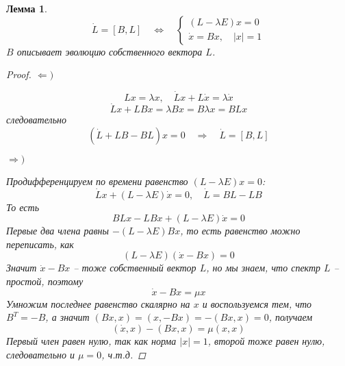 \documentclass[a4paper,12pt]{article}
\newtheorem{lemma}{Лемма}
\theoremstyle{definition}
\theoremstyle{definition}
\theoremstyle{definition}
\begin{document}
\begin{lemma}
  \begin{equation}
    \label{eq:5}
      \dot{L}=[B,L] \quad\Longleftrightarrow\quad \left\{
          \begin{array}{l}
            (L-\lambda E)x=0\\
            \dot{x}=B x,\quad |x|=1
          \end{array}
          \right.
  \end{equation}
$B$ описывает эволюцию собственного вектора $L$.
\begin{proof}
  $\Leftarrow )$

  \begin{equation*}
    Lx=\lambda x, \quad \dot{L}x+L\dot{x}=\lambda\dot{x}
  \end{equation*}
  \begin{equation*}
    \dot{L}x+L B  x=\lambda B x = B\lambda x= BL x
  \end{equation*}
  следовательно
  \begin{equation*}
    (\dot{L}+LB-BL)x=0\quad\Rightarrow \quad \dot{L}=[B,L]
  \end{equation*}

  $\Rightarrow )$

  Продифференцируем по времени равенство $(L-\lambda E)x=0$:
  \begin{equation*}
    \dot{L}x+(L-\lambda E)\dot{x}=0, \quad \dot{L}=BL-LB
  \end{equation*}
  То есть
  \begin{equation*}
    BLx-LBx+(L-\lambda E)\dot{x}=0
  \end{equation*}
  Первые два члена равны $-(L-\lambda E)Bx$, то есть равенство можно переписать, как
  \begin{equation*}
    (L-\lambda E)(\dot x -Bx)=0
  \end{equation*}
  Значит $\dot x-Bx$ -- тоже собственный вектор $L$, но мы знаем, что спектр $L$ -- простой, поэтому
  \begin{equation*}
    \dot x -Bx= \mu x
  \end{equation*}
  Умножим последнее равенство скалярно на $x$ и воспользуемся тем, что $B^{T}=-B$, а значит $(Bx,x)=(x,-Bx)=-(Bx,x)=0$, получаем
  \begin{equation*}
    (\dot x, x)-(B x, x)=\mu(x,x)
  \end{equation*}
  Первый член равен нулю, так как норма $|x|=1$, второй тоже равен нулю, следовательно и $\mu=0$, ч.т.д.
\end{proof}
\end{lemma}
\end{document}
